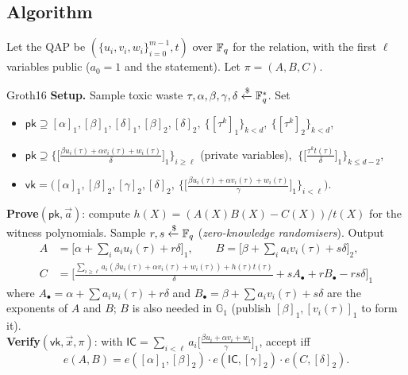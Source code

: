 \documentclass[11pt,a4paper]{report}
\theoremstyle{plain}
\theoremstyle{definition}
\theoremstyle{remark}
\newcommand{\GG}{\mathbb{G}}
\newcommand{\getsr}{\xleftarrow{\$}}
\begin{document}
\subsection{Algorithm}
Let the QAP be $(\{u_i,v_i,w_i\}_{i=0}^{m-1},t)$ over $\mathbb{F}_q$ for the relation, with the first $\ell$ variables public ($a_0=1$ and the statement). Let $\pi=(A,B,C)$.
\begin{algorithm}[label=pr:groth16]{Groth16}
\textbf{Setup.} Sample toxic waste $\tau,\alpha,\beta,\gamma,\delta\getsr\FF_q^*$. Set
\begin{itemize}[nosep]
\item $\mathsf{pk}\supseteq[\alpha]_1,[\beta]_1,[\delta]_1,[\beta]_2,[\delta]_2,\ \{[\tau^k]_1\}_{k<d},\ \{[\tau^k]_2\}_{k<d}$,
\item $\mathsf{pk}\supseteq\Big\{\Big[\tfrac{\beta u_i(\tau)+\alpha v_i(\tau)+w_i(\tau)}{\delta}\Big]_1\Big\}_{i\ge\ell}$ (private variables), $\ \Big\{\Big[\tfrac{\tau^kt(\tau)}{\delta}\Big]_1\Big\}_{k\le d-2}$,
\item $\mathsf{vk}=\Big([\alpha]_1,[\beta]_2,[\gamma]_2,[\delta]_2,\ \Big\{\Big[\tfrac{\beta u_i(\tau)+\alpha v_i(\tau)+w_i(\tau)}{\gamma}\Big]_1\Big\}_{i<\ell}\Big)$.
\end{itemize}
\textbf{Prove}$(\mathsf{pk},\vec a)$: compute $h(X)=(A(X)B(X)-C(X))/t(X)$ for the witness polynomials. Sample $r,s\getsr\FF_q$ (\emph{zero-knowledge randomisers}). Output
\begin{align*}
A&=\big[\alpha+\textstyle\sum_ia_iu_i(\tau)+r\delta\big]_1,\qquad B=\big[\beta+\textstyle\sum_ia_iv_i(\tau)+s\delta\big]_2,\\
C&=\Big[\tfrac{\sum_{i\ge\ell}a_i(\beta u_i(\tau)+\alpha v_i(\tau)+w_i(\tau))+h(\tau)t(\tau)}{\delta}+sA_\bullet+rB_\bullet-rs\delta\Big]_1
\end{align*}
where $A_\bullet=\alpha+\sum a_iu_i(\tau)+r\delta$ and $B_\bullet=\beta+\sum a_iv_i(\tau)+s\delta$ are the exponents of $A$ and $B$; $B$ is also needed in $\GG_1$ (publish $[\beta]_1,[v_i(\tau)]_1$ to form it).\\
\textbf{Verify}$(\mathsf{vk},\vec x,\pi)$: with $\mathsf{IC}=\sum_{i<\ell}a_i\Big[\tfrac{\beta u_i+\alpha v_i+w_i}{\gamma}\Big]_1$, accept iff
\[e(A,B)=e([\alpha]_1,[\beta]_2)\cdot e(\mathsf{IC},[\gamma]_2)\cdot e(C,[\delta]_2).\]
\end{algorithm}
\end{document}
